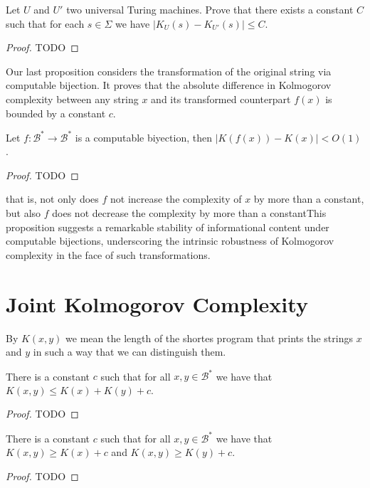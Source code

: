 \begin{proposition}
Let $U$ and $U'$ two universal Turing machines. Prove that there exists a constant $C$ such that for each $s \in \Sigma$ we have $\mid K_{U}(s) - K_{U'}(s) \mid \leq C$.
\end{proposition}
\begin{proof}
{\color{red} TODO}
\end{proof}

Our last proposition considers the transformation of the original string via computable bijection. It proves that the absolute difference in Kolmogorov complexity between any string \(x\) and its transformed counterpart \(f(x)\) is bounded by a constant $c$.

\begin{proposition}
Let $f:\mathcal{B}^{\ast} \to \mathcal{B}^{\ast}$ is a computable biyection, then $| K(f(x)) -  K(x) | < O(1)$.
\end{proposition}
\begin{proof}
{\color{red} TODO}
\end{proof}

that is, not only does $f$ not increase the complexity of $x$ by more than a constant, but also $f$ does not decrease the complexity by more than a constantThis proposition suggests a remarkable stability of informational content under computable bijections, underscoring the intrinsic robustness of Kolmogorov complexity in the face of such transformations.


%
%

\section{Joint Kolmogorov Complexity}

By $K(x, y)$ we mean the length of the shortes program that prints the strings $x$ and $y$ in such a way that we can distinguish them.

\begin{proposition}
\label{prop:additive_kolmogorov}
There is a constant $c$ such that for all $x, y \in\mathcal{B}^{\ast}$ we have that $K(x, y) \leq K(x) + K(y) + c$.
\end{proposition}
\begin{proof}
{\color{red} TODO}
\end{proof}

\begin{proposition}
\label{prop:excess_kolmogorov}
There is a constant $c$ such that for all $x, y \in\mathcal{B}^{\ast}$ we have that $K(x, y) \geq K(x) + c$ and $K(x, y) \geq K(y) + c$.
\end{proposition}
\begin{proof}
{\color{red} TODO}
\end{proof}

